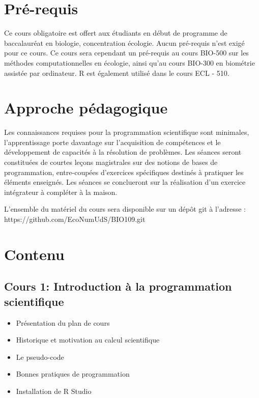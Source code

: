 \documentclass[12]{article}
\begin{document}
	\section*{Pré-requis}

	Ce cours obligatoire est offert aux étudiants en début de programme de
	baccalauréat en biologie, concentration écologie. Aucun pré-requis n'est
	exigé pour ce cours. Ce cours sera cependant un pré-requis au cours
	BIO-500 sur les méthodes computationnelles en écologie, ainsi qu'au cours
	BIO-300 en biométrie assistée par ordinateur. R est également utilisé
	dans le cours ECL - 510.

	\section*{Approche pédagogique}

	Les connaissances requises pour la programmation scientifique sont
	minimales, l'apprentissage porte davantage sur l'acquisition de
	compétences et le développement de capacités à la résolution de problèmes.
	Les séances seront constituées de courtes leçons magistrales sur des
	notions de bases de programmation, entre-coupées d'exercices spécifiques
	destinés à pratiquer les éléments enseignés. Les séances se conclueront
	sur la réalisation d'un exercice intégrateur à compléter à la maison.

	L'ensemble du matériel du cours sera disponible sur un dépôt git à l'adresse :\\
	https://github.com/EcoNumUdS/BIO109.git

	\section*{Contenu}

	\subsection*{Cours 1: Introduction à la programmation scientifique}
	\begin{itemize}
	\renewcommand{\labelitemi}{$\bullet$}	
		\item Présentation du plan de cours
		\item Historique et motivation au calcul scientifique
		\item Le pseudo-code
		\item Bonnes pratiques de programmation
		\item Installation de R Studio
	\end{itemize}
\end{document}
